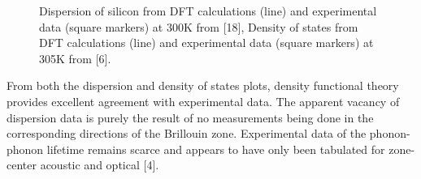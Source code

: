 \documentclass{article}
\numberwithin{equation}{section}
\begin{document}
\begin{figure}[!ht]
\centering
{}
\label{fig:subfigureExample}
\caption[Optional caption for list of figures]{ Dispersion of silicon from DFT calculations (line) and experimental data (square markers) at 300K from [18],  Density of states from DFT calculations (line) and experimental data (square markers) at 305K from [6].}
\end{figure}
From both the dispersion and density of states plots, density functional theory provides excellent agreement with experimental data. The apparent vacancy of dispersion data is purely the result of no measurements being done in the corresponding directions of the Brillouin zone. Experimental data of the phonon-phonon lifetime remains scarce and appears to have only been tabulated for zone-center acoustic and optical [4].
\end{document}
